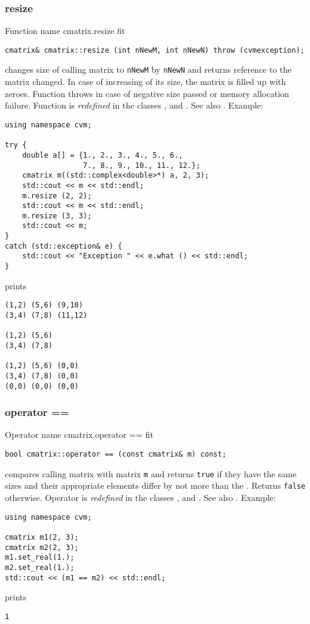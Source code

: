 \subsubsection{resize}
Function%
\pdfdest name {cmatrix.resize} fit
\begin{verbatim}
cmatrix& cmatrix::resize (int nNewM, int nNewN) throw (cvmexception);
\end{verbatim}
changes  size of  calling matrix to \verb"nNewM" by \verb"nNewN"
and returns  reference to
the matrix changed. In case of increasing of its size, the matrix
is filled up with zeroes.
Function throws  
in case of negative size passed or memory allocation failure.
Function is \emph{redefined} in the classes
,  
and .
See also .
Example:
\begin{Verbatim}
using namespace cvm;

try {
    double a[] = {1., 2., 3., 4., 5., 6.,
                  7., 8., 9., 10., 11., 12.};
    cmatrix m((std::complex<double>*) a, 2, 3);
    std::cout << m << std::endl;
    m.resize (2, 2);
    std::cout << m << std::endl;
    m.resize (3, 3);
    std::cout << m;
}
catch (std::exception& e) {
    std::cout << "Exception " << e.what () << std::endl;
}
\end{Verbatim}
prints
\begin{Verbatim}
(1,2) (5,6) (9,10)
(3,4) (7,8) (11,12)

(1,2) (5,6)
(3,4) (7,8)

(1,2) (5,6) (0,0)
(3,4) (7,8) (0,0)
(0,0) (0,0) (0,0)
\end{Verbatim}
\newpage



\subsubsection{operator ==}
Operator%
\pdfdest name {cmatrix.operator ==} fit
\begin{verbatim}
bool cmatrix::operator == (const cmatrix& m) const;
\end{verbatim}
compares  calling matrix with  matrix \verb"m"
and returns \verb"true" if they have the same sizes
and their appropriate elements differ by not more than the
.
Returns \verb"false" otherwise.
Operator is \emph{redefined} in the classes
,  
and .
See also .
Example:
\begin{Verbatim}
using namespace cvm;

cmatrix m1(2, 3);
cmatrix m2(2, 3);
m1.set_real(1.);
m2.set_real(1.);
std::cout << (m1 == m2) << std::endl;
\end{Verbatim}
prints
\begin{Verbatim}
1
\end{Verbatim}
\newpage



